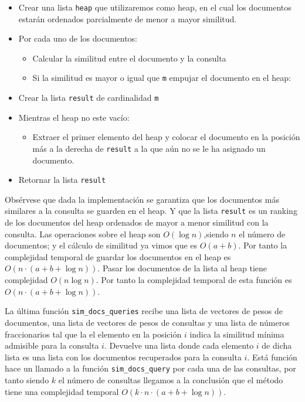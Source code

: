 \documentclass[runningheads]{llncs}
\begin{document}
	\begin{itemize}
		\item Crear una lista \verb|heap| que utilizaremos como heap, en el cual los documentos estar\'an ordenados parcialmente de menor a mayor similitud.
		\item Por cada uno de los documentos:
		\begin{itemize}
			\item Calcular la similitud entre el documento y la consulta
			\item Si la similitud es mayor o igual que \verb|m| empujar el documento en el heap:
		\end{itemize}
		\item Crear la lista \verb|result| de cardinalidad \verb|m|
		\item Mientras el heap no este vac\'io:
		\begin{itemize}
			\item Extraer el primer elemento del heap y colocar el documento en la posici\'on m\'as a la derecha de \verb|result| a la que a\'un no se le ha asignado un documento.
		\end{itemize}
		\item Retornar la lista \verb|result|
	\end{itemize}
	
	Obs\'ervese que dada la implementaci\'on se garantiza que los documentos m\'as similares a la consulta se guarden en el heap. Y que la lista \verb|result| es un ranking de los documentos del heap ordenados de mayor a menor similitud con la consulta. Las operaciones sobre el heap son $O(\log n)$,siendo $n$ el n\'umero de documentos; y el c\'alculo de similitud ya vimos que es $O(a + b)$. Por tanto la complejidad temporal de guardar los documentos en el heap es $O(n\cdot(a+b+\log n))$. Pasar los documentos de la lista al heap tiene complejidad $O(n\log n)$.  Por tanto la complejidad temporal de esta funci\'on es $O(n\cdot(a+b+\log n))$.
	
	La \'ultima funci\'on \verb|sim_docs_queries| recibe una lista de vectores de pesos de documentos, una lista de vectores de pesos de consultas y una lista de n\'umeros fraccionarios tal que la el elemento en la posici\'on $i$ indica la similitud m\'inima admisible para la consulta $i$. Devuelve una lista donde cada elemento $i$ de dicha lista es una lista con los documentos recuperados para la consulta $i$. Est\'a funci\'on hace un llamado a la funci\'on \verb|sim_docs_query| por cada una de las consultas, por tanto siendo $k$ el n\'umero de consultas llegamos a la conclusi\'on que el m\'etodo tiene una complejidad temporal $O(k\cdot n\cdot(a+b+\log n))$.
	
\end{document}
